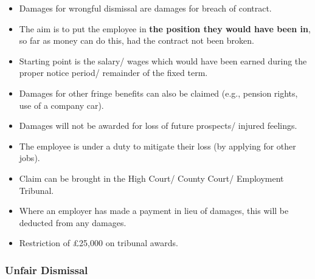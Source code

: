 \documentclass[
]{article}
\providecommand{\tightlist}{%
  \setlength{\itemsep}{0pt}\setlength{\parskip}{0pt}}
\begin{document}
\begin{itemize}
\tightlist
\item
  Damages for wrongful dismissal are damages for breach of contract.
\item
  The aim is to put the employee in \textbf{the position they would have
  been in}, so far as money can do this, had the contract not been
  broken.
\item
  Starting point is the salary/ wages which would have been earned
  during the proper notice period/ remainder of the fixed term.
\item
  Damages for other fringe benefits can also be claimed (e.g., pension
  rights, use of a company car).
\item
  Damages will not be awarded for loss of future prospects/ injured
  feelings.
\item
  The employee is under a duty to mitigate their loss (by applying for
  other jobs).
\item
  Claim can be brought in the High Court/ County Court/ Employment
  Tribunal.
\item
  Where an employer has made a payment in lieu of damages, this will be
  deducted from any damages.
\item
  Restriction of £25,000 on tribunal awards.
\end{itemize}

\hypertarget{unfair-dismissal}{%
\subsubsection{Unfair Dismissal}\label{unfair-dismissal}}
\end{document}
